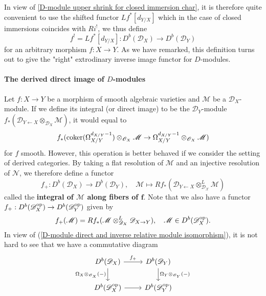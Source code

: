 \begin{remark}
In view of \cref{D-module upper shrink for closed immersion char}, it is therefore quite convenient to use the shifted functor $Lf^*[d_{Y/X}]$ which in the case of closed immersions coincides with $Ri^!$, we thus define
\[f^!=Lf^*[d_{Y/X}]:D^b(\mathscr{D}_X)\to D^b(\mathscr{D}_Y)\]
for an arbitrary morphism $f:X\to Y$. As we have remarked, this definition turns out to give the "right" extrodinary inverse image functor for $D$-modules.
\end{remark}

\paragraph{The derived direct image of \texorpdfstring{$D$}{D}-modules}
Let $f:X\to Y$ be a morphism of smooth algebraic varieties and $\mathscr{M}$ be a $\mathscr{D}_X$-module. If we define its integral (or direct image) to be the $\mathscr{D}_Y$-module $f_*(\mathscr{D}_{Y\leftarrow X}\otimes_{\mathscr{D}_X}\mathscr{M})$, it would equal to
\[f_*(\operatorname{coker}(\Omega_{X/Y}^{d_{X/Y}-1})\otimes_{\mathscr{O}_X}\mathscr{M}\to\Omega_{X/Y}^{d_{X/Y}-1}\otimes_{\mathscr{O}_X}\mathscr{M})\]
for $f$ smooth. However, this operation is better behaved if we consider the setting of derived categories. By taking a flat resolution of $\mathscr{M}$ and an injective resolution of $\mathscr{N}$, we therefore define a functor
\[f_+:D^b(\mathscr{D}_X)\to D^b(\mathscr{D}_Y),\quad \mathscr{M}\mapsto Rf_*(\mathscr{D}_{Y\leftarrow X}\otimes_{\mathscr{D_X}}^L\mathscr{M})\]
called the \textbf{integral of $\mathscr{M}$ along fibers of $\bm{f}$}. Note that we also have a functor $f_+:D^b(\mathscr{D}_X^{\mathrm{op}})\to D^b(\mathscr{D}_Y^{\mathrm{op}})$ given by
\[f_+(\mathscr{M})=Rf_*(\mathscr{M}\otimes_{\mathscr{D}_X}^L\mathscr{D}_{X\to Y}),\quad \mathscr{M}\in D^b(\mathscr{D}_X^{\mathrm{op}}).\]
In view of (\ref{D-module direct and inverse relative module isomorphism}), it is not hard to see that we have a commutative diagram
\[\begin{tikzcd}
D^b(\mathscr{D}_X)\ar[r,"f_+"]\ar[d,swap,"\Omega_X\otimes_{\mathscr{O}_X}(-)"]&D^b(\mathscr{D}_Y)\ar[d,"\Omega_Y\otimes_{\mathscr{O}_Y}(-)"]\\
D^b(\mathscr{D}_X^{\op})\ar[r]&D^b(\mathscr{D}_Y^{\op})
\end{tikzcd}\]

